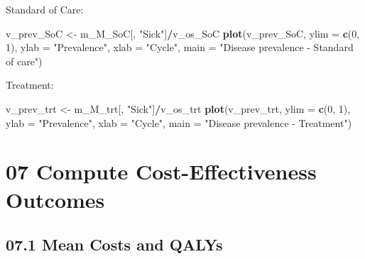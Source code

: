 \documentclass[]{article}
\newenvironment{Shaded}{\begin{snugshade}}{\end{snugshade}}
\newcommand{\KeywordTok}[1]{\textcolor[rgb]{0.13,0.29,0.53}{\textbf{#1}}}
\newcommand{\DataTypeTok}[1]{\textcolor[rgb]{0.13,0.29,0.53}{#1}}
\newcommand{\DecValTok}[1]{\textcolor[rgb]{0.00,0.00,0.81}{#1}}
\newcommand{\StringTok}[1]{\textcolor[rgb]{0.31,0.60,0.02}{#1}}
\newcommand{\OperatorTok}[1]{\textcolor[rgb]{0.81,0.36,0.00}{\textbf{#1}}}
\newcommand{\NormalTok}[1]{#1}
\begin{document}
Standard of Care:

\begin{Shaded}
\begin{Highlighting}[]
\NormalTok{v_prev_SoC <-}\StringTok{ }\NormalTok{m_M_SoC[, }\StringTok{"Sick"}\NormalTok{]}\OperatorTok{/}\NormalTok{v_os_SoC}
\KeywordTok{plot}\NormalTok{(v_prev_SoC,}
     \DataTypeTok{ylim =} \KeywordTok{c}\NormalTok{(}\DecValTok{0}\NormalTok{, }\DecValTok{1}\NormalTok{),}
     \DataTypeTok{ylab =} \StringTok{"Prevalence"}\NormalTok{,}
     \DataTypeTok{xlab =} \StringTok{"Cycle"}\NormalTok{,}
     \DataTypeTok{main =} \StringTok{"Disease prevalence - Standard of care"}\NormalTok{)}
\end{Highlighting}
\end{Shaded}

Treatment:

\begin{Shaded}
\begin{Highlighting}[]
\NormalTok{v_prev_trt <-}\StringTok{ }\NormalTok{m_M_trt[, }\StringTok{"Sick"}\NormalTok{]}\OperatorTok{/}\NormalTok{v_os_trt}
\KeywordTok{plot}\NormalTok{(v_prev_trt,}
     \DataTypeTok{ylim =} \KeywordTok{c}\NormalTok{(}\DecValTok{0}\NormalTok{, }\DecValTok{1}\NormalTok{),}
     \DataTypeTok{ylab =} \StringTok{"Prevalence"}\NormalTok{,}
     \DataTypeTok{xlab =} \StringTok{"Cycle"}\NormalTok{,}
     \DataTypeTok{main =} \StringTok{"Disease prevalence - Treatment"}\NormalTok{)}
\end{Highlighting}
\end{Shaded}

\section{07 Compute Cost-Effectiveness
Outcomes}\label{compute-cost-effectiveness-outcomes}

\subsection{07.1 Mean Costs and QALYs}\label{mean-costs-and-qalys}
\end{document}
